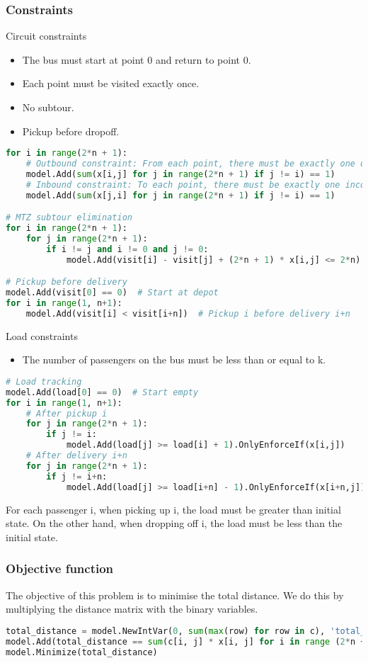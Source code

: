\documentclass{article}
\begin{document}
\subsubsection{Constraints}
Circuit constraints
\begin{itemize}
    \item The bus must start at point 0 and return to point 0.
    \item Each point must be visited exactly once.
    \item No subtour.
    \item Pickup before dropoff.
\end{itemize}
\begin{lstlisting}[language=Python]
for i in range(2*n + 1):
    # Outbound constraint: From each point, there must be exactly one outgoing edge.
    model.Add(sum(x[i,j] for j in range(2*n + 1) if j != i) == 1)
    # Inbound constraint: To each point, there must be exactly one incoming edge.
    model.Add(sum(x[j,i] for j in range(2*n + 1) if j != i) == 1)

# MTZ subtour elimination
for i in range(2*n + 1):
    for j in range(2*n + 1):
        if i != j and i != 0 and j != 0:
            model.Add(visit[i] - visit[j] + (2*n + 1) * x[i,j] <= 2*n)

# Pickup before delivery
model.Add(visit[0] == 0)  # Start at depot
for i in range(1, n+1):
    model.Add(visit[i] < visit[i+n])  # Pickup i before delivery i+n
\end{lstlisting}

Load constraints
\begin{itemize}
    \item The number of passengers on the bus must be less than or equal to k.
\end{itemize}
\begin{lstlisting}[language=Python]
# Load tracking
model.Add(load[0] == 0)  # Start empty
for i in range(1, n+1):
    # After pickup i
    for j in range(2*n + 1):
        if j != i:
            model.Add(load[j] >= load[i] + 1).OnlyEnforceIf(x[i,j])
    # After delivery i+n
    for j in range(2*n + 1):
        if j != i+n:
            model.Add(load[j] >= load[i+n] - 1).OnlyEnforceIf(x[i+n,j])
\end{lstlisting}

For each passenger i, when picking up i, the load must be greater than initial state.
On the other hand, when dropping off i, the load must be less than the initial state.

\subsubsection{Objective function}
The objective of this problem is to minimise the total distance. We do this by multiplying
the distance matrix with the binary variables.
\begin{lstlisting}[language=Python]
total_distance = model.NewIntVar(0, sum(max(row) for row in c), 'total_distance')
model.Add(total_distance == sum(c[i, j] * x[i, j] for i in range (2*n + 1) for j in range(2*n + 1) if i != j))
model.Minimize(total_distance)
\end{lstlisting}
\end{document}
